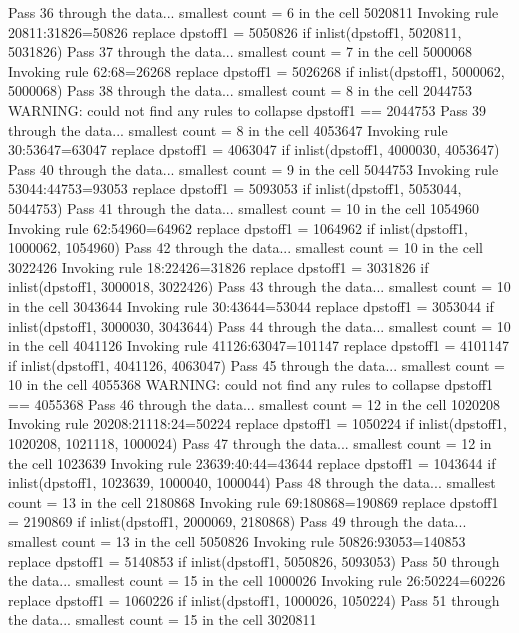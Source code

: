 Pass 36 through the data...
  smallest count = 6 in the cell      5020811
  Invoking rule 20811:31826=50826
  replace dpstoff1 = 5050826 if inlist(dpstoff1, 5020811, 5031826)
Pass 37 through the data...
  smallest count = 7 in the cell      5000068
  Invoking rule 62:68=26268
  replace dpstoff1 = 5026268 if inlist(dpstoff1, 5000062, 5000068)
Pass 38 through the data...
  smallest count = 8 in the cell      2044753
  WARNING: could not find any rules to collapse dpstoff1 == 2044753
Pass 39 through the data...
  smallest count = 8 in the cell      4053647
  Invoking rule 30:53647=63047
  replace dpstoff1 = 4063047 if inlist(dpstoff1, 4000030, 4053647)
Pass 40 through the data...
  smallest count = 9 in the cell      5044753
  Invoking rule 53044:44753=93053
  replace dpstoff1 = 5093053 if inlist(dpstoff1, 5053044, 5044753)
Pass 41 through the data...
  smallest count = 10 in the cell      1054960
  Invoking rule 62:54960=64962
  replace dpstoff1 = 1064962 if inlist(dpstoff1, 1000062, 1054960)
Pass 42 through the data...
  smallest count = 10 in the cell      3022426
  Invoking rule 18:22426=31826
  replace dpstoff1 = 3031826 if inlist(dpstoff1, 3000018, 3022426)
Pass 43 through the data...
  smallest count = 10 in the cell      3043644
  Invoking rule 30:43644=53044
  replace dpstoff1 = 3053044 if inlist(dpstoff1, 3000030, 3043644)
Pass 44 through the data...
  smallest count = 10 in the cell      4041126
  Invoking rule 41126:63047=101147
  replace dpstoff1 = 4101147 if inlist(dpstoff1, 4041126, 4063047)
Pass 45 through the data...
  smallest count = 10 in the cell      4055368
  WARNING: could not find any rules to collapse dpstoff1 == 4055368
Pass 46 through the data...
  smallest count = 12 in the cell      1020208
  Invoking rule 20208:21118:24=50224
  replace dpstoff1 = 1050224 if inlist(dpstoff1, 1020208, 1021118, 1000024)
Pass 47 through the data...
  smallest count = 12 in the cell      1023639
  Invoking rule 23639:40:44=43644
  replace dpstoff1 = 1043644 if inlist(dpstoff1, 1023639, 1000040, 1000044)
Pass 48 through the data...
  smallest count = 13 in the cell      2180868
  Invoking rule 69:180868=190869
  replace dpstoff1 = 2190869 if inlist(dpstoff1, 2000069, 2180868)
Pass 49 through the data...
  smallest count = 13 in the cell      5050826
  Invoking rule 50826:93053=140853
  replace dpstoff1 = 5140853 if inlist(dpstoff1, 5050826, 5093053)
Pass 50 through the data...
  smallest count = 15 in the cell      1000026
  Invoking rule 26:50224=60226
  replace dpstoff1 = 1060226 if inlist(dpstoff1, 1000026, 1050224)
Pass 51 through the data...
  smallest count = 15 in the cell      3020811
